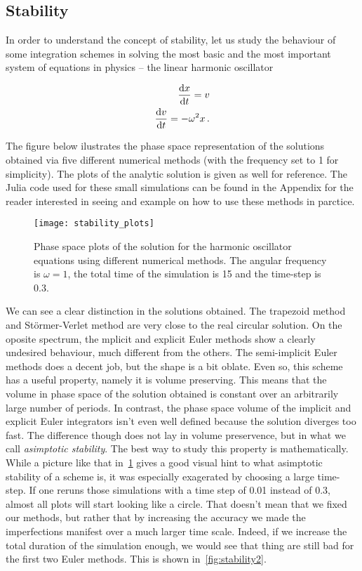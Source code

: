 \documentclass[12pt, class=report, crop=false]{standalone}
\begin{document}
\subsection{Stability}

In order to understand the concept of stability, let us study the behaviour of some integration schemes in solving the most basic and the most important system of equations in physics -- the linear harmonic oscillator

\begin{subequations}
  \label{eq:HO}
  \begin{align}
    \dv{x}{t} = v\\
    \dv{v}{t} = -\omega^2 x\,.
  \end{align}
\end{subequations}

The figure below ilustrates the phase space representation of the solutions obtained via five different numerical methods (with the frequency set to 1 for simplicity). The plots of the analytic solution is given as well for reference. The Julia code used for these small simulations can be found in the Appendix for the reader interested in seeing and example on how to use these methods in parctice.

\begin{figure}[h]
  \centering
  \texttt{[image: stability\_plots]}%
  \caption{Phase space plots of the solution for the harmonic oscillator equations using different numerical methods. The angular frequency is \(\omega =1\), the total time of the simulation is 15 and the time-step is 0.3.}\label{fig:stability}%
\end{figure}

We can see a clear distinction in the solutions obtained. The trapezoid method and Störmer-Verlet method are very close to the real circular solution. On the oposite spectrum, the mplicit and explicit Euler methods show a clearly undesired behaviour, much different from the others. The semi-implicit Euler methods does a decent job, but the shape is a bit oblate. Even so, this scheme has a useful property, namely it is volume preserving. This means that the volume in phase space of the solution obtained is constant over an arbitrarily large number of periods. In contrast, the phase space volume of the implicit and explicit Euler integrators isn't even well defined because the solution diverges too fast. The difference though does not lay in volume preservence, but in what we call \textit{asimptotic stability}. The best way to study this property is mathematically. While a picture like that in~\cref{fig:stability} gives a good visual hint to what asimptotic stability of a scheme is, it was especially exagerated by choosing a large time-step. If one reruns those simulations with a time step of 0.01 instead of 0.3, almost all plots will start looking like a circle. That doesn't mean that we fixed our methods, but rather that by increasing the accuracy we made the imperfections manifest over a much larger time scale. Indeed, if we increase the total duration of the simulation enough, we would see that thing are still bad for the first two Euler methods. This is shown in~\cref{fig:stability2}.
\end{document}
